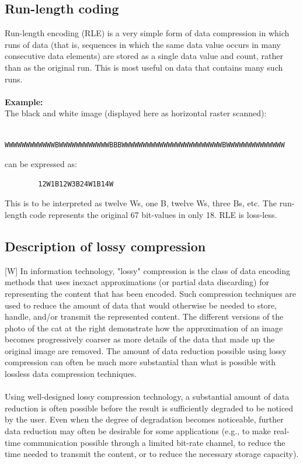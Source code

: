 \documentclass[12pt]{article}
\begin{document}
    \subsection{Run-length coding}
    Run-length encoding (RLE) is a very simple form of data compression in which runs of data (that
    is, sequences in which the same data value occurs in many consecutive data elements) are stored
    as a single data value and count, rather than as the original run. This is most useful on data 
    that contains many such runs. \\
    \\
    \textbf{Example:}\\
    The black and white image (displayed here as horizontal raster scanned):
    \begin{verbatim}
        WWWWWWWWWWWWBWWWWWWWWWWWWBBBWWWWWWWWWWWWWWWWWWWWWWWWBWWWWWWWWWWWWWW
    \end{verbatim}
    can be expressed as:
    \begin{verbatim}
        12W1B12W3B24W1B14W
    \end{verbatim}
        This is to be interpreted as twelve Ws, one B, twelve Ws, three Bs, etc.
        The run-length code represents the original 67 bit-values in only 18.
        RLE is loss-less.
    \subsection{Description of lossy compression}
    [W] In information technology, "lossy" compression is the class of data encoding 
    methods that uses inexact approximations (or partial data discarding) for 
    representing the content that has been encoded. Such compression techniques are 
    used to reduce the amount of data that would otherwise be needed to store, handle,
    and/or transmit the represented content. The different versions of the photo of 
    the cat at the right demonstrate how the approximation of an image becomes 
    progressively coarser as more details of the data that made up the original 
    image are removed. The amount of data reduction possible using lossy compression can 
    often be much more substantial than what is possible with lossless data compression
    techniques.\\
    \\
    Using well-designed lossy compression technology, a substantial amount of data 
    reduction is often possible before the result is sufficiently degraded to be noticed 
    by the user. Even when the degree of degradation becomes noticeable, further data reduction 
    may often be desirable for some applications (e.g., to make real-time communication 
    possible through a limited bit-rate channel, to reduce the time needed to transmit the 
    content, or to reduce the necessary storage capacity).
\end{document}
